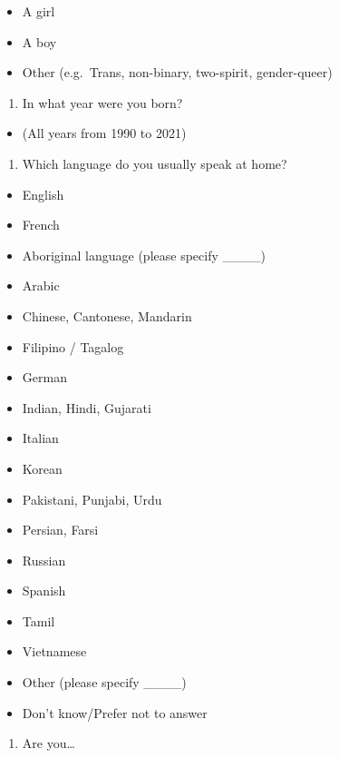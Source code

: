 \documentclass[
  letterpaper,
  DIV=11,
  numbers=noendperiod]{scrreprt}
\providecommand{\tightlist}{%
  \setlength{\itemsep}{0pt}\setlength{\parskip}{0pt}}\usepackage{longtable,booktabs,array}
\begin{document}
\begin{itemize}
\tightlist
\item
  A girl
\item
  A boy
\item
  Other (e.g.~Trans, non-binary, two-spirit, gender-queer)
\end{itemize}

\begin{enumerate}
\def\labelenumi{\arabic{enumi}.}
\setcounter{enumi}{15}
\tightlist
\item
  In what year were you born?
\end{enumerate}

\begin{itemize}
\tightlist
\item
  (All years from 1990 to 2021)
\end{itemize}

\begin{enumerate}
\def\labelenumi{\arabic{enumi}.}
\setcounter{enumi}{16}
\tightlist
\item
  Which language do you usually speak at home?
\end{enumerate}

\begin{itemize}
\tightlist
\item
  English
\item
  French
\item
  Aboriginal language (please specify \_\_\_\_)
\item
  Arabic
\item
  Chinese, Cantonese, Mandarin
\item
  Filipino / Tagalog
\item
  German
\item
  Indian, Hindi, Gujarati
\item
  Italian
\item
  Korean
\item
  Pakistani, Punjabi, Urdu
\item
  Persian, Farsi
\item
  Russian
\item
  Spanish
\item
  Tamil
\item
  Vietnamese
\item
  Other (please specify \_\_\_\_)
\item
  Don't know/Prefer not to answer
\end{itemize}

\begin{enumerate}
\def\labelenumi{\arabic{enumi}.}
\setcounter{enumi}{17}
\tightlist
\item
  Are you\ldots{}
\end{enumerate}
\end{document}
